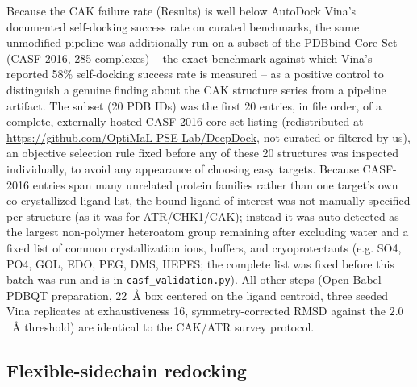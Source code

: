 \documentclass[11pt]{article}
\begin{document}
Because the CAK failure rate (Results) is well below AutoDock Vina's
documented self-docking success rate on curated benchmarks, the same
unmodified pipeline was additionally run on a subset of the PDBbind Core
Set (CASF-2016, 285 complexes) -- the exact benchmark against which
Vina's reported 58\% self-docking success rate is measured
\citep{zhang2023} -- as a positive control to distinguish a genuine
finding about the CAK structure series from a pipeline artifact. The
subset (20 PDB IDs) was the first 20 entries, in file order, of a
complete, externally hosted CASF-2016 core-set listing (redistributed at
\url{https://github.com/OptiMaL-PSE-Lab/DeepDock}, not curated or
filtered by us), an objective selection rule fixed before any of these
20 structures was inspected individually, to avoid any appearance of
choosing easy targets. Because CASF-2016 entries span many unrelated
protein families rather than one target's own co-crystallized ligand
list, the bound ligand of interest was not manually specified per
structure (as it was for ATR/CHK1/CAK); instead it was auto-detected as
the largest non-polymer heteroatom group remaining after excluding water
and a fixed list of common crystallization ions, buffers, and
cryoprotectants (e.g. SO4, PO4, GOL, EDO, PEG, DMS, HEPES; the complete
list was fixed before this batch was run and is in
\texttt{casf\_validation.py}). All other steps (Open Babel PDBQT
preparation, 22~{\AA} box centered on the ligand centroid, three seeded
Vina replicates at exhaustiveness 16, symmetry-corrected RMSD against the
$2.0$~{\AA} threshold) are identical to the CAK/ATR survey protocol.

\subsection*{Flexible-sidechain redocking}
\end{document}
